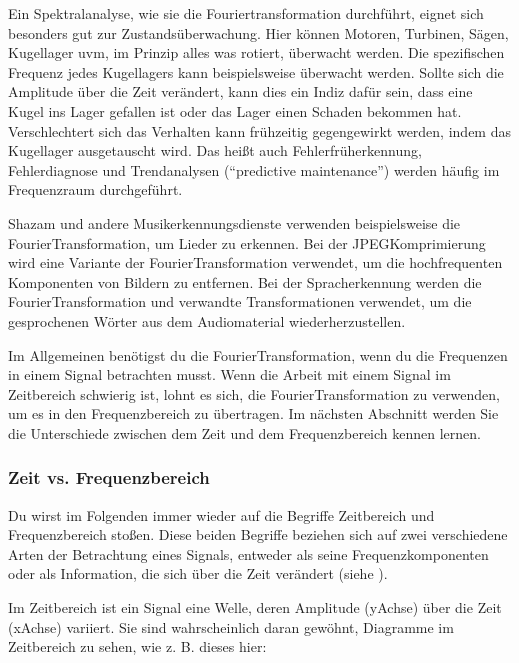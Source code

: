 \documentclass[letterpaper,10pt,english]{jupyterBook}
\begin{document}
\sphinxAtStartPar
Ein Spektralanalyse, wie sie die Fouriertransformation durchführt, eignet sich besonders gut zur Zustandsüberwachung. Hier können Motoren, Turbinen, Sägen, Kugellager uvm, im Prinzip alles was rotiert, überwacht werden. Die spezifischen Frequenz jedes Kugellagers kann beispielsweise überwacht werden. Sollte sich die Amplitude über die Zeit verändert, kann dies ein Indiz dafür sein, dass eine Kugel ins Lager gefallen ist oder das Lager einen Schaden bekommen hat. Verschlechtert sich das Verhalten kann frühzeitig gegengewirkt werden, indem das Kugellager ausgetauscht wird. Das heißt auch Fehlerfrüherkennung, Fehlerdiagnose und Trendanalysen (“predictive maintenance”) werden häufig im Frequenzraum durchgeführt.

\sphinxAtStartPar
Shazam und andere Musikerkennungsdienste verwenden beispielsweise die Fourier\sphinxhyphen{}Transformation, um Lieder zu erkennen. Bei der JPEG\sphinxhyphen{}Komprimierung wird eine Variante der Fourier\sphinxhyphen{}Transformation verwendet, um die hochfrequenten Komponenten von Bildern zu entfernen. Bei der Spracherkennung werden die Fourier\sphinxhyphen{}Transformation und verwandte Transformationen verwendet, um die gesprochenen Wörter aus dem Audiomaterial wiederherzustellen.

\sphinxAtStartPar
Im Allgemeinen benötigst du die Fourier\sphinxhyphen{}Transformation, wenn du die Frequenzen in einem Signal betrachten musst. Wenn die Arbeit mit einem Signal im Zeitbereich schwierig ist, lohnt es sich, die Fourier\sphinxhyphen{}Transformation zu verwenden, um es in den Frequenzbereich zu übertragen. Im nächsten Abschnitt werden Sie die Unterschiede zwischen dem Zeit\sphinxhyphen{} und dem Frequenzbereich kennen lernen.


\subsubsection{Zeit\sphinxhyphen{} vs. Frequenzbereich}
\label{\detokenize{content/3_FourierAnalyse:zeit-vs-frequenzbereich}}
\sphinxAtStartPar
Du wirst im Folgenden immer wieder auf die Begriffe Zeitbereich und Frequenzbereich stoßen. Diese beiden Begriffe beziehen sich auf zwei verschiedene Arten der Betrachtung eines Signals, entweder als seine Frequenzkomponenten oder als Information, die sich über die Zeit verändert (siehe {\hyperref[\detokenize{content/3_Messsignale::doc}]{}}).

\sphinxAtStartPar
Im Zeitbereich ist ein Signal eine Welle, deren Amplitude (y\sphinxhyphen{}Achse) über die Zeit (x\sphinxhyphen{}Achse) variiert. Sie sind wahrscheinlich daran gewöhnt, Diagramme im Zeitbereich zu sehen, wie z. B. dieses hier:
\end{document}
